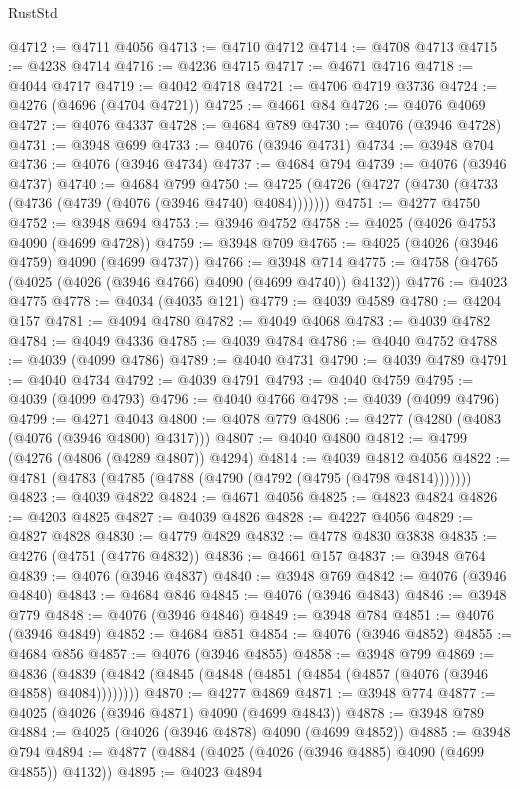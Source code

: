 \begin{lexlean}{RustStd}
\begin{coremodule}
@4712 := @4711 @4056
@4713 := @4710 @4712
@4714 := @4708 @4713
@4715 := @4238 @4714
@4716 := @4236 @4715
@4717 := @4671 @4716
@4718 := @4044 @4717
@4719 := @4042 @4718
@4721 := @4706 @4719 @3736
@4724 := @4276 (@4696 (@4704 @4721))
@4725 := @4661 @84
@4726 := @4076 @4069
@4727 := @4076 @4337
@4728 := @4684 @789
@4730 := @4076 (@3946 @4728)
@4731 := @3948 @699
@4733 := @4076 (@3946 @4731)
@4734 := @3948 @704
@4736 := @4076 (@3946 @4734)
@4737 := @4684 @794
@4739 := @4076 (@3946 @4737)
@4740 := @4684 @799
@4750 := @4725 (@4726 (@4727 (@4730 (@4733 (@4736 (@4739 (@4076 (@3946 @4740) @4084)))))))
@4751 := @4277 @4750
@4752 := @3948 @694
@4753 := @3946 @4752
@4758 := @4025 (@4026 @4753 @4090 (@4699 @4728))
@4759 := @3948 @709
@4765 := @4025 (@4026 (@3946 @4759) @4090 (@4699 @4737))
@4766 := @3948 @714
@4775 := @4758 (@4765 (@4025 (@4026 (@3946 @4766) @4090 (@4699 @4740)) @4132))
@4776 := @4023 @4775
@4778 := @4034 (@4035 @121)
@4779 := @4039 @4589
@4780 := @4204 @157
@4781 := @4094 @4780
@4782 := @4049 @4068
@4783 := @4039 @4782
@4784 := @4049 @4336
@4785 := @4039 @4784
@4786 := @4040 @4752
@4788 := @4039 (@4099 @4786)
@4789 := @4040 @4731
@4790 := @4039 @4789
@4791 := @4040 @4734
@4792 := @4039 @4791
@4793 := @4040 @4759
@4795 := @4039 (@4099 @4793)
@4796 := @4040 @4766
@4798 := @4039 (@4099 @4796)
@4799 := @4271 @4043
@4800 := @4078 @779
@4806 := @4277 (@4280 (@4083 (@4076 (@3946 @4800) @4317)))
@4807 := @4040 @4800
@4812 := @4799 (@4276 (@4806 (@4289 @4807)) @4294)
@4814 := @4039 @4812 @4056
@4822 := @4781 (@4783 (@4785 (@4788 (@4790 (@4792 (@4795 (@4798 @4814)))))))
@4823 := @4039 @4822
@4824 := @4671 @4056
@4825 := @4823 @4824
@4826 := @4203 @4825
@4827 := @4039 @4826
@4828 := @4227 @4056
@4829 := @4827 @4828
@4830 := @4779 @4829
@4832 := @4778 @4830 @3838
@4835 := @4276 (@4751 (@4776 @4832))
@4836 := @4661 @157
@4837 := @3948 @764
@4839 := @4076 (@3946 @4837)
@4840 := @3948 @769
@4842 := @4076 (@3946 @4840)
@4843 := @4684 @846
@4845 := @4076 (@3946 @4843)
@4846 := @3948 @779
@4848 := @4076 (@3946 @4846)
@4849 := @3948 @784
@4851 := @4076 (@3946 @4849)
@4852 := @4684 @851
@4854 := @4076 (@3946 @4852)
@4855 := @4684 @856
@4857 := @4076 (@3946 @4855)
@4858 := @3948 @799
@4869 := @4836 (@4839 (@4842 (@4845 (@4848 (@4851 (@4854 (@4857 (@4076 (@3946 @4858) @4084))))))))
@4870 := @4277 @4869
@4871 := @3948 @774
@4877 := @4025 (@4026 (@3946 @4871) @4090 (@4699 @4843))
@4878 := @3948 @789
@4884 := @4025 (@4026 (@3946 @4878) @4090 (@4699 @4852))
@4885 := @3948 @794
@4894 := @4877 (@4884 (@4025 (@4026 (@3946 @4885) @4090 (@4699 @4855)) @4132))
@4895 := @4023 @4894

\end{coremodule}
\end{lexlean}
